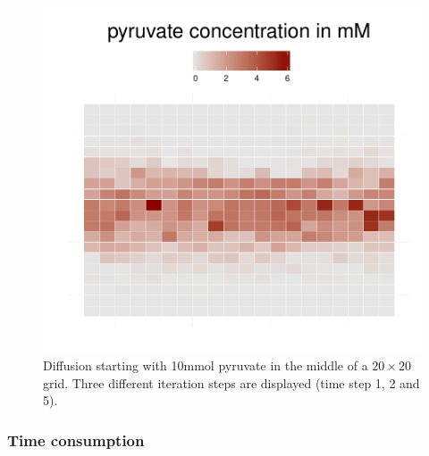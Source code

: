 \begin{figure}[h!]
\begin{minipage}[t]{0.3\textwidth}
  \end{minipage}
  \begin{minipage}[t]{0.3\textwidth}
    \includegraphics[width=\textwidth]{diff5.pdf}
  \end{minipage}
  \caption{Diffusion starting with 10\;mmol pyruvate in the middle of a $20\times20$ grid. Three different iteration steps are displayed (time step 1, 2 and 5).}
  \label{fig:diff}
\end{figure}

\subsubsection{Time consumption}

